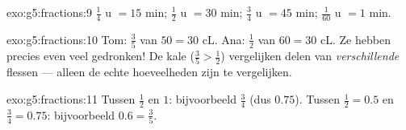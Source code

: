 \begin{solution}{exo:g5:fractions:9}
$\frac14$ u $= 15$ min; $\frac12$ u $= 30$ min; $\frac34$ u $= 45$ min;
$\frac{1}{60}$ u $= 1$ min.
\end{solution}

\begin{solution}{exo:g5:fractions:10}
Tom: $\frac35$ van $50 = 30$ cL. Ana: $\frac12$ van $60 = 30$ cL. Ze hebben
precies even veel gedronken! De kale  ($\frac35 > \frac12$)
vergelijken delen van \emph{verschillende} flessen --- alleen de echte
hoeveelheden zijn te vergelijken.
\end{solution}

\begin{solution}{exo:g5:fractions:11}
Tussen $\frac12$ en $1$: bijvoorbeeld $\frac34$ (dus $0.75$). Tussen
$\frac12 = 0.5$ en $\frac34 = 0.75$: bijvoorbeeld $0.6 = \frac35$.
\end{solution}
